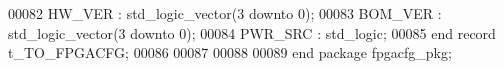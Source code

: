 \begin{DoxyCode}
00082       \textcolor{vhdlchar}{HW_VER}   \textcolor{vhdlchar}{:} \textcolor{comment}{std\_logic\_vector}\textcolor{vhdlchar}{(}\textcolor{vhdllogic}{}\textcolor{vhdllogic}{3} \textcolor{keywordflow}{downto} \textcolor{vhdllogic}{}\textcolor{vhdllogic}{0}\textcolor{vhdlchar}{)};
00083       \textcolor{vhdlchar}{BOM_VER}  \textcolor{vhdlchar}{:} \textcolor{comment}{std\_logic\_vector}\textcolor{vhdlchar}{(}\textcolor{vhdllogic}{}\textcolor{vhdllogic}{3} \textcolor{keywordflow}{downto} \textcolor{vhdllogic}{}\textcolor{vhdllogic}{0}\textcolor{vhdlchar}{)};
00084       \textcolor{vhdlchar}{PWR_SRC}  \textcolor{vhdlchar}{:} \textcolor{comment}{std\_logic};
00085    \textcolor{keywordflow}{end} \textcolor{keywordflow}{record} \textcolor{vhdlchar}{t_TO_FPGACFG};
00086    
00087 
00088       
00089 \textcolor{keywordflow}{end} \textcolor{keywordflow}{package} \textcolor{vhdlchar}{fpgacfg\_pkg};
\end{DoxyCode}
